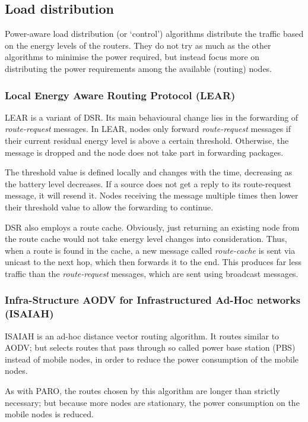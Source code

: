 \subsection{Load distribution}\label{load-distribution}
Power-aware load distribution (or `control') algorithms distribute the
traffic based on the energy levels of the routers.
They do not try as much as the other algorithms to minimise the power required,
but instead focus more on distributing the power requirements among the available (routing) nodes.

\subsubsection{Local Energy Aware Routing Protocol (LEAR)}
LEAR\cite{woo2001non} is a variant of DSR.
Its main behavioural change lies in the forwarding of \textit{route-request} messages.
In LEAR, nodes only forward \textit{route-request} messages if their current residual
energy level is above a certain threshold. Otherwise, the message is dropped
and the node does not take part in forwarding packages.

The threshold value is defined locally and changes with the time, decreasing
as the battery level decreases. If a source does not get a reply to its
route-request message, it will resend it. Nodes receiving the message multiple
times then lower their threshold value to allow the forwarding to continue.

DSR also employs a route cache. Obviously, just returning an existing node
from the route cache would not take energy level changes into consideration.
Thus, when a route is found in the cache, a new message called \textit{route-cache}
is sent via unicast to the next hop, which then forwards it to the end. This
produces far less traffic than the \textit{route-request} messages, which are
sent using broadcast messages.

\subsubsection{Infra-Structure AODV for Infrastructured Ad-Hoc networks (ISAIAH)}
ISAIAH\cite{lindgren2002infrastructured} is an ad-hoc distance vector routing
algorithm. It routes similar to AODV; but selects routes that pass through
so called power base station (PBS) instead of mobile nodes, in order to reduce
the power consumption of the mobile nodes.

As with PARO, the routes chosen by this algorithm are longer than strictly necessary; but
because more nodes are stationary, the power consumption on the mobile nodes
is reduced.

